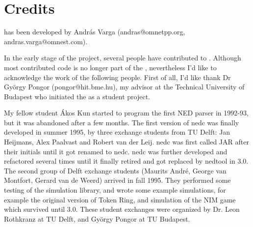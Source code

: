 %
%
%
%
%
%
%
%
%
%
%
%
%
%
%
%
%
%
%
%
%


\section{Credits}

{\omnetpp} has been developed by Andr\'{a}s Varga (andras@omnetpp.org,
andras.varga@omnest.com).

In the early stage of the project, several people have contributed
to {\omnetpp}. Although most contributed code is no longer part of
the {\omnetpp}, nevertheless I'd like to acknowledge the work of the
following people. First of all, I'd like thank Dr Gy\"{o}rgy Pongor
(pongor@hit.bme.hu), my advisor at the Technical University of Budapest
who initiated the {\omnetpp} as a student project.

My fellow student \'{A}kos Kun started to program the first NED parser
in 1992-93, but it was abandoned after a few months.
The first version of nedc was finally developed in summer 1995,
by three exchange students from TU Delft: Jan Heijmans, Alex Paalvast
and Robert van der Leij. nedc was first called JAR after their initials
until it got renamed to nedc. nedc was further developed and refactored
several times until it finally retired and got replaced by nedtool in {\omnetpp} 3.0.
The second group of Delft exchange students (Maurits Andr\'{e},
George van Montfort, Gerard van de Weerd) arrived in fall 1995.
They performed some testing of the simulation library, and
wrote some example simulations, for example the original version of Token Ring,
and simulation of the NIM game which survived until {\omnetpp} 3.0.
These student exchanges were organized by Dr. Leon Rothkranz
at TU Delft, and Gy\"{o}rgy Pongor at TU Budapest.

